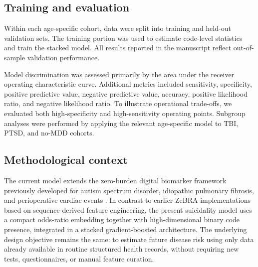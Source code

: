 \documentclass[onecolumn, compsoc,11pt]{IEEEtran}
\begin{document}
\subsection*{Training and evaluation}

Within each age-specific cohort, data were split into training and held-out validation sets. The training portion was used to estimate code-level statistics and train the stacked model. All results reported in the manuscript reflect out-of-sample validation performance.

Model discrimination was assessed primarily by the area under the receiver operating characteristic curve. Additional metrics included sensitivity, specificity, positive predictive value, negative predictive value, accuracy, positive likelihood ratio, and negative likelihood ratio. To illustrate operational trade-offs, we evaluated both high-specificity and high-sensitivity operating points. Subgroup analyses were performed by applying the relevant age-specific model to TBI, PTSD, and no-MDD cohorts.


\subsection*{Methodological context}

The current model extends the zero-burden digital biomarker framework previously developed for autism spectrum disorder, idiopathic pulmonary fibrosis, and perioperative cardiac events \cite{onishchenko2021reduced,onishchenko2022screening,JAHA2022}. In contrast to earlier ZeBRA implementations based on sequence-derived feature engineering, the present suicidality model uses a compact odds-ratio embedding together with high-dimensional binary code presence, integrated in a stacked gradient-boosted architecture. The underlying design objective remains the same: to estimate future disease risk using only data already available in routine structured health records, without requiring new tests, questionnaires, or manual feature curation.



\end{document}
